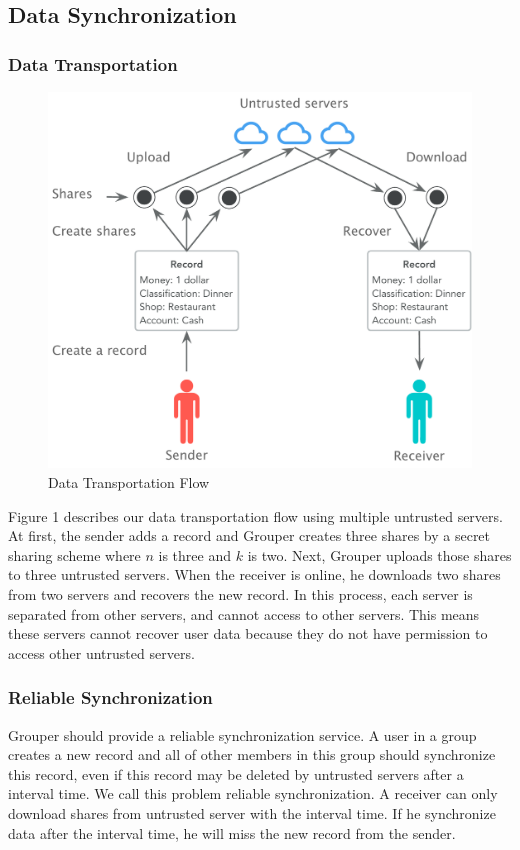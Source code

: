\documentclass[twocolumn,10pt]{article}
\begin{document}
\subsection{Data Synchronization}

\subsubsection{Data Transportation}
\begin{figure}[t]
	\centering
	\includegraphics[scale=0.38]{sync_flow}
	\caption{Data Transportation Flow}
\end{figure}

Figure 1 describes our data transportation flow using multiple untrusted servers. At first, the sender adds a record and Grouper creates three shares by a secret sharing scheme where $n$ is three and $k$ is two. Next, Grouper uploads those shares to three untrusted servers. When the receiver is online, he downloads two shares from two servers and recovers the new record. In this process, each server is separated from other servers, and cannot access to other servers. This means these servers cannot recover user data because they do not have permission to access other untrusted servers. 

\subsubsection{Reliable Synchronization}
Grouper should provide a reliable synchronization service. A user in a group creates a new record and all of other members in this group should synchronize this record, even if this record may be deleted by untrusted servers after a interval time. We call this problem reliable synchronization. A receiver can only download shares from untrusted server with the interval time. If he synchronize data after the interval time, he will miss the new record from the sender.
\end{document}
